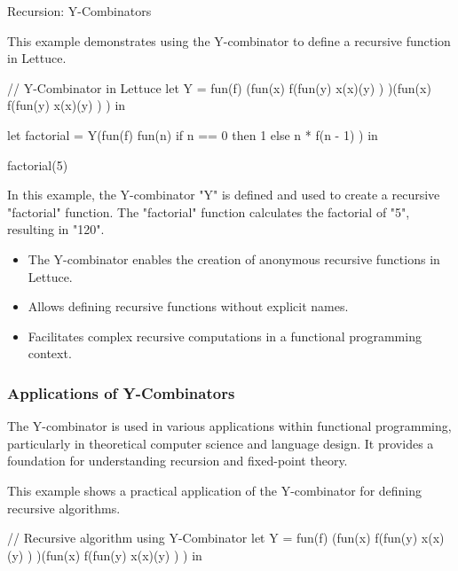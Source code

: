 \begin{notes}{Recursion: Y-Combinators}
\begin{highlight}
        This example demonstrates using the Y-combinator to define a recursive function in Lettuce.
    
    \begin{code}[Lettuce]
    // Y-Combinator in Lettuce
    let Y = fun(f) {
        (fun(x) { f(fun(y) { x(x)(y) }) })(fun(x) { f(fun(y) { x(x)(y) }) })
    } in
    
    let factorial = Y(fun(f) {
        fun(n) {
            if n == 0 then 1 else n * f(n - 1)
        }
    }) in
    
    factorial(5)
    \end{code}
    
        In this example, the Y-combinator "Y" is defined and used to create a recursive "factorial" function. The "factorial" function calculates the factorial of "5", resulting in "120".
    
        \begin{itemize}
            \item The Y-combinator enables the creation of anonymous recursive functions in Lettuce.
            \item Allows defining recursive functions without explicit names.
            \item Facilitates complex recursive computations in a functional programming context.
        \end{itemize}
    
    \end{highlight}
    
    \subsubsection*{Applications of Y-Combinators}
    
    The Y-combinator is used in various applications within functional programming, particularly in theoretical computer science and language design. It provides a foundation for understanding recursion and fixed-point theory.
    
    \begin{highlight}
    
        This example shows a practical application of the Y-combinator for defining recursive algorithms.
    
    \begin{code}[Lettuce]
    // Recursive algorithm using Y-Combinator
    let Y = fun(f) {
        (fun(x) { f(fun(y) { x(x)(y) }) })(fun(x) { f(fun(y) { x(x)(y) }) })
    } in
    

\end{code}
\end{highlight}
\end{notes}
